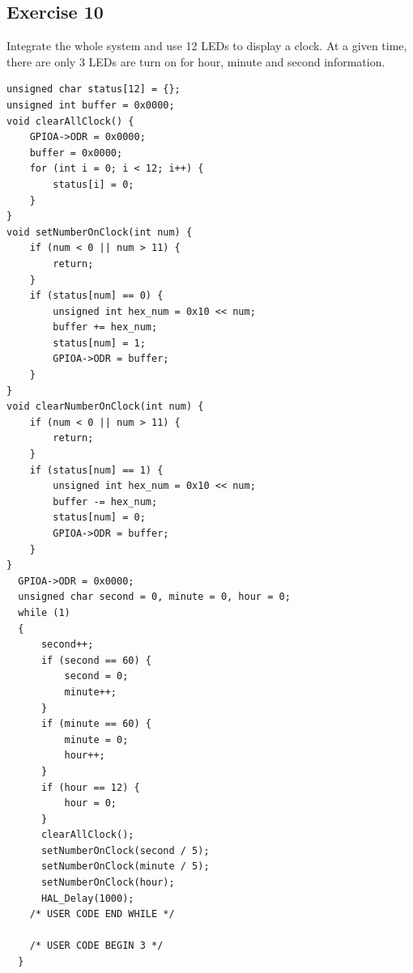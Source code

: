\subsection{Exercise 10}
Integrate the whole system and use 12 LEDs to display a clock. At a given time, there are only 3 LEDs are turn on for hour, minute and second information.
\begin{lstlisting}
unsigned char status[12] = {};
unsigned int buffer = 0x0000;
void clearAllClock() {
	GPIOA->ODR = 0x0000;
	buffer = 0x0000;
	for (int i = 0; i < 12; i++) {
		status[i] = 0;
	}
}
void setNumberOnClock(int num) {
	if (num < 0 || num > 11) {
		return;
	}
	if (status[num] == 0) {
		unsigned int hex_num = 0x10 << num;
		buffer += hex_num;
		status[num] = 1;
		GPIOA->ODR = buffer;
	}
}
void clearNumberOnClock(int num) {
	if (num < 0 || num > 11) {
		return;
	}
	if (status[num] == 1) {
		unsigned int hex_num = 0x10 << num;
		buffer -= hex_num;
		status[num] = 0;
		GPIOA->ODR = buffer;
	}
}
  GPIOA->ODR = 0x0000;
  unsigned char second = 0, minute = 0, hour = 0;
  while (1)
  {
	  second++;
	  if (second == 60) {
		  second = 0;
		  minute++;
	  }
	  if (minute == 60) {
		  minute = 0;
		  hour++;
	  }
	  if (hour == 12) {
		  hour = 0;
	  }
	  clearAllClock();
	  setNumberOnClock(second / 5);
	  setNumberOnClock(minute / 5);
	  setNumberOnClock(hour);
	  HAL_Delay(1000);
    /* USER CODE END WHILE */

    /* USER CODE BEGIN 3 */
  }
\end{lstlisting}